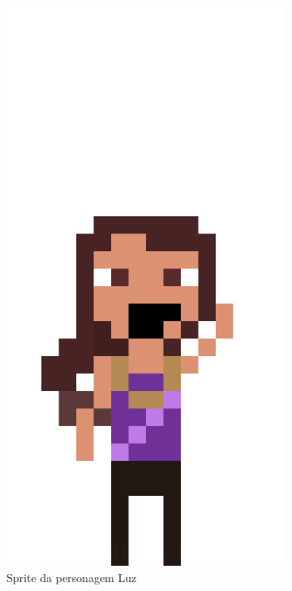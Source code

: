 \begin{figure}[htbp]
\begin{subfigure}{0.32\linewidth}
        \includegraphics[width=1\linewidth]{figs/sprites/irma.png}
        \caption{\small Sprite da personagem Luz}
        \label{fig:pixelLabIrma}
    \end{subfigure}
    \begin{subfigure}{1\linewidth}

\end{subfigure}
\end{figure}
